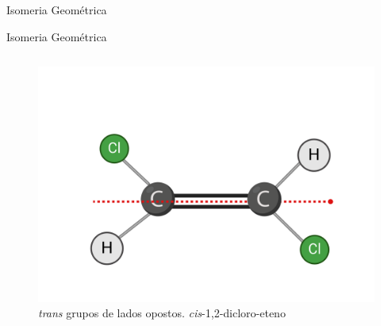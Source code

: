 \documentclass{beamer}
\begin{document}
\begin{frame}[label={sec:orge237f00}]{Isomeria Geométrica}
\begin{block}{Isomeria Geométrica}
\begin{columns}
\begin{column}{0.4\columnwidth}
\begin{figure}[htbp]
\centering
\includegraphics[width=.9\linewidth]{./Trans.png}
\caption{\emph{trans} grupos de lados opostos.  \emph{cis}-1,2-dicloro-eteno}
\end{figure}
\end{column}
\end{columns}
\end{block}
\end{frame}
\end{document}
